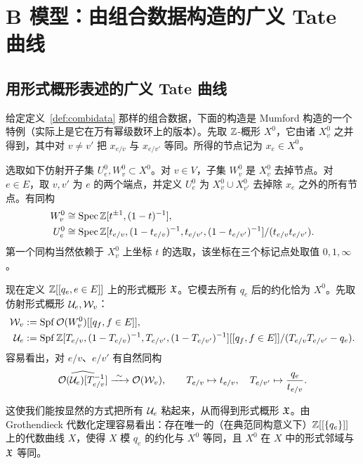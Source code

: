 \section{B 模型：由组合数据构造的广义 Tate 曲线}\label{s:Bmodel}

\subsection{用形式概形表述的广义 Tate 曲线}\label{ss:formalscheme}

给定定义~\ref{def:combidata} 那样的组合数据，下面的构造是 Mumford 构造的一个特例（实际上是它在万有幂级数环上的版本）。先取 $\mathbb{Z}$-概形 $X^0$，它由诸 $X^0_{v}$ 之并得到，其中对 $v\neq v'$ 把 $x_{e/v}$ 与 $x_{e/v'}$ 等同。所得的节点记为 $x_{e}\in X^0$。

选取如下仿射开子集 $U^0_{e},W^0_{v}\subset X^0$。对 $v\in V$，子集 $W^0_{v}$ 是 $X^0_{v}$ 去掉节点。对 $e\in E$，取 $v,v'$ 为 $e$ 的两个端点，并定义 $U^0_{e}$ 为 $X^0_{v}\cup X^0_{v'}$ 去掉除 $x_e$ 之外的所有节点。有同构
\begin{align*}
W_{v}^0&\cong\operatorname{Spec}\mathbb{Z}[t^{\pm 1},(1-t)^{-1}],\\
U_{e}^0&\cong \operatorname{Spec} \mathbb{Z}[t_{e/v},(1-t_{e/v})^{-1},t_{e/v'},(1-t_{e/v'})^{-1}]/(t_{e/v}t_{e/v'}).
\end{align*}
第一个同构当然依赖于 $X_{v}^0$ 上坐标 $t$ 的选取，该坐标在三个标记点处取值 $0,1,\infty$。

现在定义 $\mathbb{Z}[[q_{e},e\in E]]$ 上的形式概形 $\mathfrak{X}$。它模去所有 $q_e$ 后的约化恰为 $X^0$。先取仿射形式概形 $\mathcal{U}_{e},\mathcal{W}_{v}$：
\begin{align*}
\mathcal{W}_{v}&:=\operatorname{Spf} \mathcal{O}(W_{v}^0)[[q_{f},f\in E]],\\
\mathcal{U}_{e}&:=\operatorname{Spf}\mathbb{Z}[T_{e/v},(1-T_{e/v})^{-1},T_{e/v'},(1-T_{e/v'})^{-1}][[q_{f},f\in E]]/(T_{e/v}T_{e/v'}-q_{e}).
\end{align*}
容易看出，对 $e/v$、$e/v'$ 有自然同构
\[
\widehat{\cO(\cU_{e})[T_{e/v}^{-1}]}\xrightarrow{\ \sim\ }\cO(\cW_{v}),\qquad
T_{e/v}\mapsto t_{e/v},\quad T_{e/v'}\mapsto \frac{q_{e}}{t_{e/v}}.
\]

这使我们能按显然的方式把所有 $\mathcal{U}_{e}$ 粘起来，从而得到形式概形 $\mathfrak{X}$。由 Grothendieck 代数化定理容易看出：存在唯一的（在典范同构意义下）$\mathbb{Z}[[\{q_{e}\}]]$ 上的代数曲线 $X$，使得 $X$ 模 $q_e$ 的约化与 $X^0$ 等同，且 $X^0$ 在 $X$ 中的形式邻域与 $\mathfrak{X}$ 等同。

